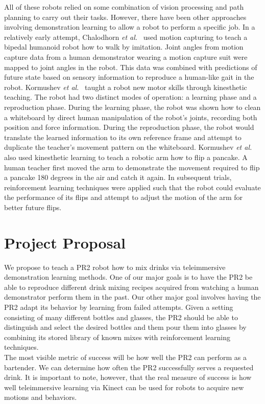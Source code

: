 \documentclass{sig-alternate}
\begin{document}
All of these robots relied on some combination of vision processing and path planning to carry out their tasks. However, there have been other approaches involving demonstration learning to allow a robot to perform a specific job. In a relatively early attempt, Chalodhorn \textit{et al.}~\cite{walk_imitation} used motion capturing to teach a bipedal humanoid robot how to walk by imitation. Joint angles from motion capture data from a human demonstrator wearing a motion capture suit were mapped to joint angles in the robot. This data was combined with predictions of future state based on sensory information to reproduce a human-like gait in the robot. Kormushev \textit{et al.}~\cite{whiteboard} taught a robot new motor skills through kinesthetic teaching. The robot had two distinct modes of operation: a learning phase and a reproduction phase. During the learning phase, the robot was shown how to clean a whiteboard by direct human manipulation of the robot's joints, recording both position and force information. During the reproduction phase, the robot would translate the learned information to its own reference frame and attempt to duplicate the teacher's movement pattern on the whiteboard.  Kormushev \textit{et al.}~\cite{pancakes} also used kinesthetic learning to teach a robotic arm how to flip a pancake. A human teacher first moved the arm to demonstrate the movement required to flip a pancake 180 degrees in the air and catch it again. In subsequent trials, reinforcement learning techniques were applied such that the robot could evaluate the performance of its flips and attempt to adjust the motion of the arm for better future flips.

\section{Project Proposal}
\label{sec:project_proposal}We propose to teach a PR2 robot how to mix drinks via
teleimmersive demonstration learning methods. One of our major goals is to have the PR2
be able to reproduce different drink mixing recipes acquired from watching
a human demonstrator perform them in the past.
Our other major goal involves having the PR2 adapt its behavior by learning from failed attempts.
Given a setting consisting of many different bottles and glasses, the PR2 should be able to 
distinguish and select the desired bottles and them pour them into glasses by
combining its stored library of known mixes with reinforcement learning techniques.\\
The most visible metric of success will be  how well the PR2
can perform as a bartender. We can determine how often the PR2
successfully serves a requested drink. It is important to note, however, that the real
measure of success is how well teleimmersive learning via Kinect can be used
for robots to acquire new motions and behaviors.
\end{document}
